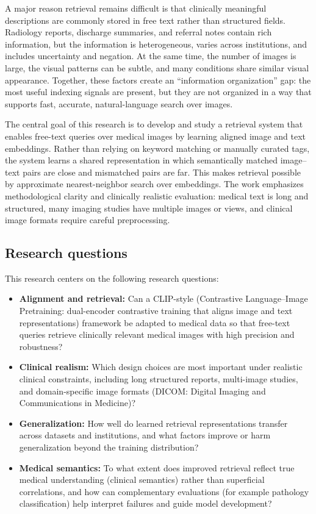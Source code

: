 \documentclass[11pt,a4paper]{article}
\begin{document}
A major reason retrieval remains difficult is that clinically meaningful descriptions are commonly stored in free text rather than structured fields. Radiology reports, discharge summaries, and referral notes contain rich information, but the information is heterogeneous, varies across institutions, and includes uncertainty and negation. At the same time, the number of images is large, the visual patterns can be subtle, and many conditions share similar visual appearance. Together, these factors create an ``information organization'' gap: the most useful indexing signals are present, but they are not organized in a way that supports fast, accurate, natural-language search over images.

The central goal of this research is to develop and study a retrieval system that enables free-text queries over medical images by learning aligned image and text embeddings. Rather than relying on keyword matching or manually curated tags, the system learns a shared representation in which semantically matched image--text pairs are close and mismatched pairs are far. This makes retrieval possible by approximate nearest-neighbor search over embeddings. The work emphasizes methodological clarity and clinically realistic evaluation: medical text is long and structured, many imaging studies have multiple images or views, and clinical image formats require careful preprocessing.

\subsection*{Research questions}
This research centers on the following research questions:
\begin{itemize}
    \item \textbf{Alignment and retrieval:} Can a CLIP-style (Contrastive Language--Image Pretraining: dual-encoder contrastive training that aligns image and text representations) framework be adapted to medical data so that free-text queries retrieve clinically relevant medical images with high precision and robustness?
    \item \textbf{Clinical realism:} Which design choices are most important under realistic clinical constraints, including long structured reports, multi-image studies, and domain-specific image formats (DICOM: Digital Imaging and Communications in Medicine)?
    \item \textbf{Generalization:} How well do learned retrieval representations transfer across datasets and institutions, and what factors improve or harm generalization beyond the training distribution?
    \item \textbf{Medical semantics:} To what extent does improved retrieval reflect true medical understanding (clinical semantics) rather than superficial correlations, and how can complementary evaluations (for example pathology classification) help interpret failures and guide model development?
\end{itemize}
\end{document}
